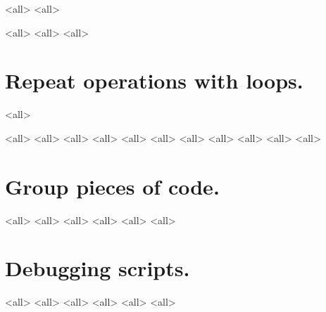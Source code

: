 \mode<all>{}
\mode<all>{}

\mode<all>{}
\mode<all>{}
\mode<all>{}



\section{Repeat operations with loops.}
\mode<all>{}


\mode<all>{}
\mode<all>{}
\mode<all>{}
\mode<all>{}
\mode<all>{}
\mode<all>{}
\mode<all>{}
\mode<all>{}
\mode<all>{}
\mode<all>{}
\mode<all>{}
%
\section{Group pieces of code.}
\mode<all>{}
\mode<all>{}
\mode<all>{}
\mode<all>{}
\mode<all>{}
\mode<all>{}

\section{Debugging scripts.}
\mode<all>{}
\mode<all>{}
\mode<all>{}
\mode<all>{}
\mode<all>{}
\mode<all>{}



